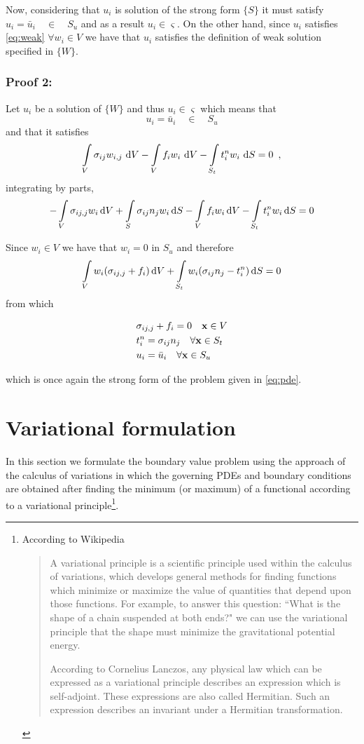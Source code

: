 Now, considering that $u_i$ is solution of the strong form $\{S\}$ it must satisfy $u_i = \bar u_{i} \quad \in \quad S_u$ and as a result $u_i \in \varsigma$. On the other hand, since $u_i$ satisfies \cref{eq:weak} $\forall {w_i} \in V$ we have that $u_i$ satisfies the definition of weak solution specified in $\{ W \}$.

\subsubsection*{Proof 2:}
Let $u_i$ be a solution of $\{W\}$ and thus $u_i \in \varsigma$ which means that
\[u_i = \bar u_{i} \quad \in \quad S_u\]
and that it satisfies
\[\int\limits_V \sigma _{ij} w_{i,j}\, \dd{V} - \int\limits_V f_i w_i\, \dd{V} - \int\limits_{S_t} t_i^n w_i\, \dd{S} = 0 \enspace ,\]
integrating by parts,
\[-\int\limits_V \sigma_{ij,j} w_i \dd{V} + \int\limits_S \sigma_{ij} n_j w_i \dd{S}  - \int\limits_V f_i w_i \dd{V} - \int\limits_{S_t} {t_i^n} w_i \dd{S} = 0\]

Since $w_i \in V$ we have that $w_i=0$ in $S_u$ and therefore
\[\int\limits_V w_i(\sigma_{ij,j} + f_i) \dd{V} + \int\limits_{S_t} w_i( \sigma_{ij} n_j - t_i^n ) \dd{S} = 0 \]
from which

\begin{equation} 
\begin{split}
&\sigma_{ij,j} + f_i = 0 \quad \vb{x} \in V \\
&t_i^n = \sigma_{ij} n_j \quad \forall \vb{x} \in S_t\\
&{u_i} = \bar{u}_i \quad \forall \vb{x} \in S_u
\end{split}
\label{equil_2}
\end{equation}

which is once again the strong form of the problem given in \cref{eq:pde}.





\section{Variational formulation}
In this section we formulate the boundary value problem using the approach of the calculus of variations in which the governing PDEs and boundary conditions are obtained after finding the minimum (or maximum) of a functional according to a variational principle\footnote{According to Wikipedia \cite{wiki:variational_principle}

\begin{quotation}
A variational principle is a scientific principle used within the calculus of variations, which develops general methods for finding functions which minimize or maximize the value of quantities that depend upon those functions. For example, to answer this question: ``What is the shape of a chain suspended at both ends?" we can use the variational principle that the shape must minimize the gravitational potential energy.

According to Cornelius Lanczos, any physical law which can be expressed as a variational principle describes an expression which is self-adjoint. These expressions are also called Hermitian. Such an expression describes an invariant under a Hermitian transformation.
\end{quotation}}.

